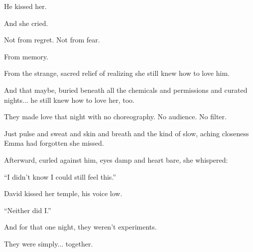 He kissed her.

And she cried.

Not from regret. Not from fear.

From memory.

From the strange, sacred relief of realizing she still knew how to love him.

And that maybe, buried beneath all the chemicals and permissions and curated nights... he 
still knew how to love her, too.

They made love that night with no choreography. No audience. No filter.

Just pulse and sweat and skin and breath and the kind of slow, aching closeness Emma had 
forgotten she missed.

Afterward, curled against him, eyes damp and heart bare, she whispered:

“I didn’t know I could still feel this.”

David kissed her temple, his voice low.

“Neither did I.”

And for that one night, they weren't experiments.

They were simply... together.

